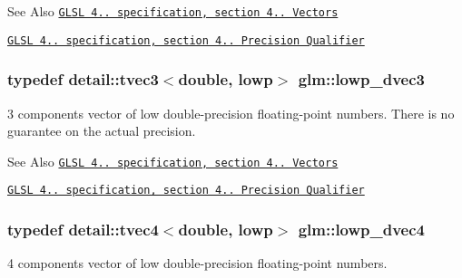 \begin{DoxySeeAlso}{See Also}
\href{http://www.opengl.org/registry/doc/GLSLangSpec.4.20.8.pdf}{\tt G\-L\-S\-L 4.. specification, section 4.. Vectors} 

\href{http://www.opengl.org/registry/doc/GLSLangSpec.4.20.8.pdf}{\tt G\-L\-S\-L 4.. specification, section 4.. Precision Qualifier} 
\end{DoxySeeAlso}
\hypertarget{group__core__precision_ga9bdb864f7242863e1227e3209f5b2dc4}{
\subsubsection[{lowp\-\_\-dvec3}]{\setlength{\rightskip}{0pt plus 5cm}typedef detail\-::tvec3$<$double, lowp$>$ {\bf glm\-::lowp\-\_\-dvec3}}}\label{group__core__precision_ga9bdb864f7242863e1227e3209f5b2dc4}
3 components vector of low double-\/precision floating-\/point numbers. There is no guarantee on the actual precision.

\begin{DoxySeeAlso}{See Also}
\href{http://www.opengl.org/registry/doc/GLSLangSpec.4.20.8.pdf}{\tt G\-L\-S\-L 4.. specification, section 4.. Vectors} 

\href{http://www.opengl.org/registry/doc/GLSLangSpec.4.20.8.pdf}{\tt G\-L\-S\-L 4.. specification, section 4.. Precision Qualifier} 
\end{DoxySeeAlso}
\hypertarget{group__core__precision_gad04432e5d5accf764e10c6674e5d0c96}{
\subsubsection[{lowp\-\_\-dvec4}]{\setlength{\rightskip}{0pt plus 5cm}typedef detail\-::tvec4$<$double, lowp$>$ {\bf glm\-::lowp\-\_\-dvec4}}}\label{group__core__precision_gad04432e5d5accf764e10c6674e5d0c96}
4 components vector of low double-\/precision floating-\/point numbers.

